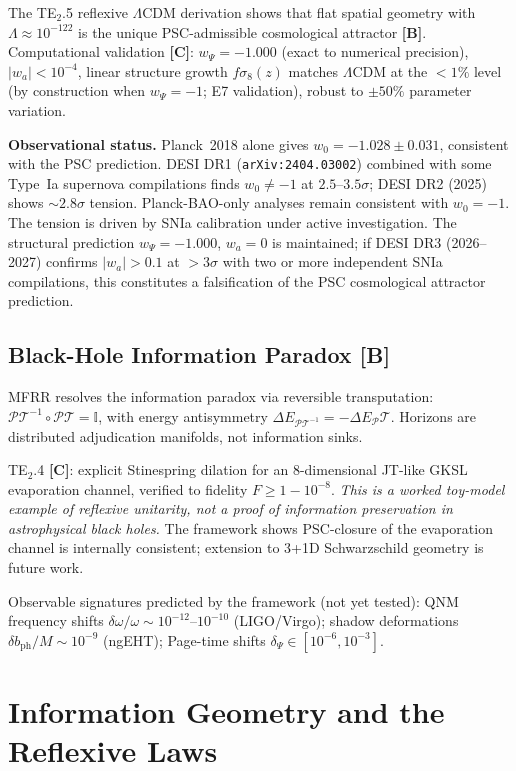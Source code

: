 \documentclass[11pt]{article}
\newcommand{\PT}{\mathcal{P}\mathcal{T}}
\newcommand{\tagB}{\textbf{[B]}}
\newcommand{\tagC}{\textbf{[C]}}
\theoremstyle{plain}
\theoremstyle{definition}
\theoremstyle{remark}
\begin{document}
The TE$_2$.5 reflexive $\Lambda$CDM derivation shows that flat spatial geometry
with $\Lambda \approx 10^{-122}$ is the unique PSC-admissible cosmological attractor \tagB{}.
Computational validation \tagC{}:
$w_\Psi = -1.000$ (exact to numerical precision),
$|w_a| < 10^{-4}$,
linear structure growth $f\sigma_8(z)$ matches $\Lambda$CDM at the $<1\%$ level
(by construction when $w_\Psi=-1$; E7 validation),
robust to $\pm 50\%$ parameter variation.

\textbf{Observational status.}
Planck~2018 alone gives $w_0 = -1.028 \pm 0.031$, consistent with the PSC prediction.
DESI DR1 (\texttt{arXiv:2404.03002}) combined with some Type~Ia supernova compilations
finds $w_0 \neq -1$ at $2.5$--$3.5\sigma$; DESI DR2 (2025) shows ${\sim}2.8\sigma$ tension.
Planck-BAO-only analyses remain consistent with $w_0 = -1$.
The tension is driven by SNIa calibration under active investigation.
The structural prediction $w_\Psi = -1.000$, $w_a = 0$ is maintained;
if DESI DR3 (2026--2027) confirms $|w_a| > 0.1$ at $>3\sigma$ with two or more
independent SNIa compilations, this constitutes a falsification of the
PSC cosmological attractor prediction.

\subsection{Black-Hole Information Paradox \tagB{}}

MFRR resolves the information paradox via reversible transputation:
$\PT^{-1} \circ \PT = \mathbb{I}$, with energy antisymmetry $\Delta E_{\PT^{-1}} = -\Delta E_\PT$.
Horizons are distributed adjudication manifolds, not information sinks.

TE$_2$.4 \tagC{}: explicit Stinespring dilation for an 8-dimensional JT-like GKSL evaporation channel,
verified to fidelity $F \ge 1 - 10^{-8}$.
\emph{This is a worked toy-model example of reflexive unitarity, not a proof of information preservation
in astrophysical black holes.}
The framework shows PSC-closure of the evaporation channel is internally consistent;
extension to 3+1D Schwarzschild geometry is future work.

Observable signatures predicted by the framework (not yet tested):
QNM frequency shifts $\delta\omega/\omega \sim 10^{-12}$--$10^{-10}$ (LIGO/Virgo);
shadow deformations $\delta b_\mathrm{ph}/M \sim 10^{-9}$ (ngEHT);
Page-time shifts $\delta_\Psi \in [10^{-6}, 10^{-3}]$.

\section{Information Geometry and the Reflexive Laws}
\label{sec:infogeo}
\end{document}
